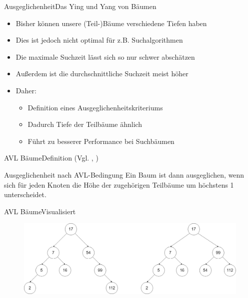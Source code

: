\begin{frame}{Ausgeglichenheit}{Das Ying und Yang von Bäumen}
	\begin{itemize}
		\item Bisher können unsere (Teil-)Bäume verschiedene Tiefen haben
		\item Dies ist jedoch nicht optimal für z.B. Suchalgorithmen
		\item Die maximale Suchzeit lässt sich so nur schwer abschätzen
		\item Außerdem ist die durchschnittliche Suchzeit meist höher
		\item Daher:
		\begin{itemize}
			\item Definition eines Ausgeglichenheitskriteriums
			\item Dadurch Tiefe der Teilbäume ähnlich
			\item Führt zu besserer Performance bei Suchbäumen
		\end{itemize}
	\end{itemize}
\end{frame}

\begin{frame}{AVL Bäume}{Definition (Vgl. \cite{fahr:list}, \cite{mutzel:avl})}
	\vfill
	\begin{alertblock}{Ausgeglichenheit nach AVL-Bedingung}
	Ein Baum ist dann ausgeglichen, wenn sich für jeden Knoten die Höhe der zugehörigen Teilbäume um
	höchstens 1 unterscheidet.
	\end{alertblock}
	\vfill
\end{frame}

\begin{frame}{AVL Bäume}{Visualisiert}
	\begin{figure}
	\centering
	\includegraphics[width=\textwidth]{graph/avl_tree_visualized}
	\end{figure}
\end{frame}

